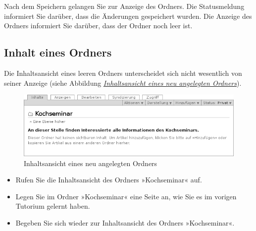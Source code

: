 \documentclass[a4paper,12pt,ngerman]{manual}
\begin{document}
Nach dem Speichern gelangen Sie zur Anzeige des Ordners. Die Statusmeldung
informiert Sie darüber, dass die Änderungen gespeichert wurden. Die Anzeige
des Ordners informiert Sie darüber, dass der Ordner noch leer ist.


\subsection{Inhalt eines Ordners}

Die Inhaltsansicht eines leeren Ordners unterscheidet sich nicht wesentlich
von seiner Anzeige (siehe Abbildung \hyperlink{fig-folder-empty}{\emph{Inhaltsansicht eines neu angelegten Ordners}}).
\hypertarget{fig-folder-empty}{}\begin{figure}[htbp]
\centering

\includegraphics{folder-empty.png}
\caption{Inhaltsansicht eines neu angelegten Ordners}\end{figure}
\begin{itemize}
\item {} 
Rufen Sie die Inhaltsansicht des Ordners »Kochseminar« auf.

\item {} 
Legen Sie im Ordner »Kochseminar« eine Seite an, wie Sie es im vorigen
Tutorium gelernt haben.

\item {} 
Begeben Sie sich wieder zur Inhaltsansicht des Ordners »Kochseminar«.

\end{itemize}
\end{document}
